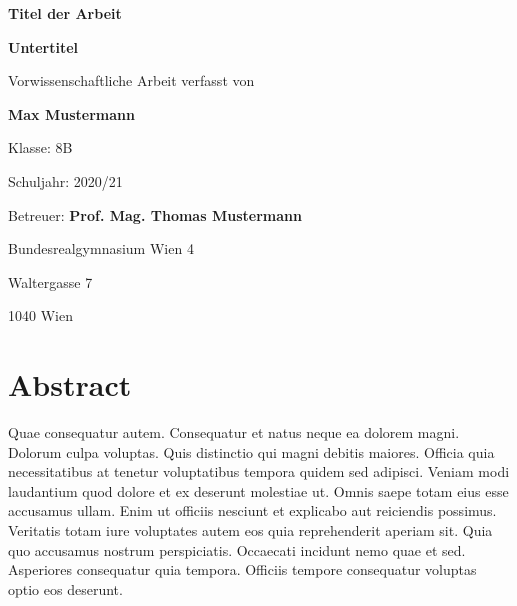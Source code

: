 \documentclass[12pt, a4paper]{article}
\begin{document}
\begin{titlepage}
    \centering
    \Large

    \vspace*{\fill}
    
    {\Huge\textbf{Titel der Arbeit}\par}
    \vspace{0.5cm}
    {\LARGE\textbf{Untertitel}}
    
    \vspace{3cm}
    
    Vorwissenschaftliche Arbeit verfasst von\par
    \textbf{Max Mustermann}\par
    
    \vspace{1.5cm}
    
    Klasse: 8B\par
    Schuljahr: 2020/21\par
    
    \vspace{1.5cm}
    
    Betreuer: \textbf{Prof. Mag. Thomas Mustermann}\par
    
    \vspace{3cm}
    
    Bundesrealgymnasium Wien 4\par
    Waltergasse 7\par
    1040 Wien
    
    \vspace*{\fill}
\end{titlepage}

\pagestyle{empty}
\setcounter{page}{2}
\section*{Abstract}

Quae consequatur autem. Consequatur et natus neque ea dolorem magni. Dolorum culpa voluptas. Quis distinctio qui magni debitis maiores. Officia quia necessitatibus at tenetur voluptatibus tempora quidem sed adipisci. Veniam modi laudantium quod dolore et ex deserunt molestiae ut. Omnis saepe totam eius esse accusamus ullam. Enim ut officiis nesciunt et explicabo aut reiciendis possimus. Veritatis totam iure voluptates autem eos quia reprehenderit aperiam sit. Quia quo accusamus nostrum perspiciatis. Occaecati incidunt nemo quae et sed. Asperiores consequatur quia tempora. Officiis tempore consequatur voluptas optio eos deserunt.
\end{document}
